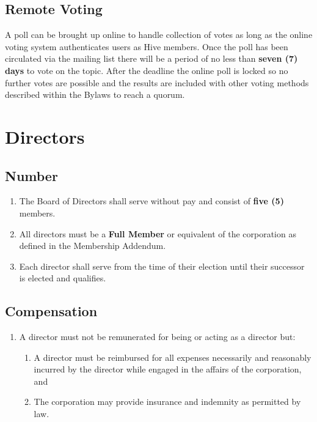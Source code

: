 \documentclass{article}
\begin{document}
\subsection{Remote Voting}
A poll can be brought up online to handle collection of votes as long as the
online voting system authenticates users as Hive members. Once the poll has been
circulated via the mailing list there will be a period of no less than \textbf{seven
(7) days} to vote on the topic. After the deadline the online poll is locked so
no further votes are possible and the results are included with other voting methods
described within the Bylaws to reach a quorum.
\section{Directors}
\subsection{Number}
\begin{enumerate}
  \item The Board of Directors shall serve without pay and consist of \textbf{five (5)}
  members.
  \item All directors must be a \textbf{Full Member} or equivalent of the corporation as
  defined in the Membership Addendum.
  \item Each director shall serve from the time of their election until their
  successor is elected and qualifies.
\end{enumerate}
\subsection{Compensation}
\begin{enumerate}
  \item A director must not be remunerated for being or acting as a director but:
  \begin{enumerate}
    \item A director must be reimbursed for all expenses necessarily and
    reasonably incurred by the director while engaged in the affairs of the corporation, and
    \item The corporation may provide insurance and indemnity as permitted by law.
  \end{enumerate}
\end{enumerate}
\end{document}
